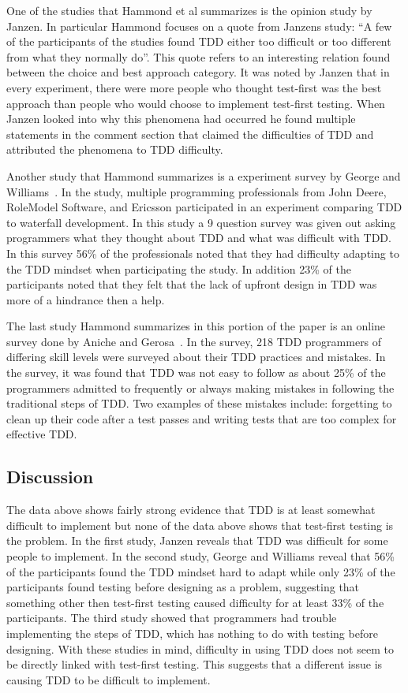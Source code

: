 \documentclass{sig-alternate}
\begin{document}
One of the studies that Hammond et al summarizes is the opinion study by Janzen.  In particular Hammond focuses on a quote from Janzens study: ``A few of the participants of the studies found TDD either too difficult or too different from what they normally do''.  This quote refers to an interesting relation found between the choice and best approach category.  It was noted by Janzen that in every experiment, there were more people who thought test-first was the best approach than people who would choose to implement test-first testing.  When Janzen looked into why this phenomena had occurred he found multiple statements in the comment section that claimed the difficulties of TDD and attributed the phenomena to TDD difficulty.

Another study that Hammond summarizes is a experiment survey by George and Williams~\cite{George:2003}.  In the study, multiple programming professionals from John Deere, RoleModel Software, and Ericsson participated in an experiment comparing TDD to waterfall development.  In this study a 9 question survey was given out asking programmers what they thought about TDD and what was difficult with TDD.  In this survey 56\% of the professionals noted that they had difficulty adapting to the TDD mindset when participating the study.  In addition 23\% of the participants noted that they felt that the lack of upfront design in TDD was more of a hindrance then a help. 

The last study Hammond summarizes in this portion of the paper is an online survey done by Aniche and Gerosa~\cite{Aniche:2010}.  In the survey, 218 TDD programmers of differing skill levels were surveyed about their TDD practices and mistakes.  In the survey, it was found that TDD was not easy to follow as about 25\% of the programmers admitted to frequently or always making mistakes in following the traditional steps of TDD.  Two examples of these mistakes include: forgetting to clean up their code after a test passes and writing tests that are too complex for effective TDD.
 
\subsection{Discussion}
The data above shows fairly strong evidence that TDD is at least somewhat difficult to implement but none of the data above shows that test-first testing is the problem.  In the first study, Janzen reveals that TDD was difficult for some people to implement.  In the second study, George and Williams reveal that 56\% of the participants found the TDD mindset hard to adapt while only 23\% of the participants found testing before designing as a problem, suggesting that something other then test-first testing caused difficulty for at least 33\% of the participants.  The third study showed that programmers had trouble implementing the steps of TDD, which has nothing to do with testing before designing.  With these studies in mind, difficulty in using TDD does not seem to be directly linked with test-first testing.  This suggests that a different issue is causing TDD to be difficult to implement.
\end{document}
